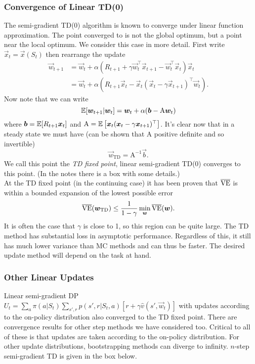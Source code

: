 \subsubsection*{Convergence of Linear TD(0)}
The semi-gradient TD(0) algorithm is known to converge under linear function approximation. The point converged to is not the global optimum, but a point near the local optimum. We consider this case in more detail. First write $\vec{x}_t = \vec{x}(S_t)$ then rearrange the update
\begin{align}
    \vec{w}_{t+1} &= \vec{w}_t + \alpha \left(R_{t+1} + \gamma \vec{w}_t^\top \vec{x}_{t+1} - \vec{w}_{t}^\top \vec{x}_t\right)\vec{x}_t \\
                  &= \vec{w}_t + \alpha \left(R_{t+1}\vec{x}_t - \vec{x}_t(\vec{x}_t -  \gamma\vec{x}_{t+1})^\top\vec{w}_t\right).
\end{align}
Now note that we can write
\[
    \mathbb{E}{}[\boldsymbol{w}_{t+1} \vert{} \boldsymbol{w}_t] = \boldsymbol{w}_t + \alpha (\boldsymbol{b} - \mathrm{A}\boldsymbol{w}_t)
\]
where $\boldsymbol{b} = \mathbb{E}{}[R_{t+1}\boldsymbol{x}_t]$ and $\mathrm{A} = \mathbb{E}{}\left[\boldsymbol{x}_t(\boldsymbol{x}_t - \gamma\boldsymbol{x}_{t+1})^\top\right]$. It's clear now that in a steady state we must have (can be shown that $\mathrm{A}$ positive definite and so invertible)
\[
    \vec{w}_{\text{TD}} = \mathrm{A}^{-1}\vec{b}.
\]
We call this point the \emph{TD fixed point}, linear semi-gradient TD(0) converges to this point. (In the notes there is a box with some details.)\\

At the TD fixed point (in the continuing case) it has been proven that $\overline{\mathrm{VE}}$ is within a bounded expansion of the lowest possible error
\begin{equation}
    \overline{\mathrm{VE}}(\boldsymbol{w}_{\text{TD}}) \leq \frac{1}{1 - \gamma} \min_{\boldsymbol{w}} \overline{\mathrm{VE}}(\boldsymbol{w}).
\end{equation}
It is often the case that $\gamma$ is close to 1, so this region can be quite large. The TD method has substantial loss in asymptotic performance. Regardless of this, it still has much lower variance than MC methods and can thus be faster. The desired update method will depend on the task at hand.\\

\subsubsection*{Other Linear Updates}
Linear semi-gradient DP $U_t = \sum_a \pi(a \vert{} S_t) \sum_{s', r} p(s', r \vert{} S_t, a) [r + \gamma \hat{v}(s', \vec{w}_t)]$ with updates according to the on-policy distribution also converged to the TD fixed point. There are convergence results for other step methods we have considered too. Critical to all of these is that updates are taken according to the on-policy distribution. For other update distributions, bootstrapping methods can diverge to infinity. $n$-step semi-gradient TD is given in the box below.\\

